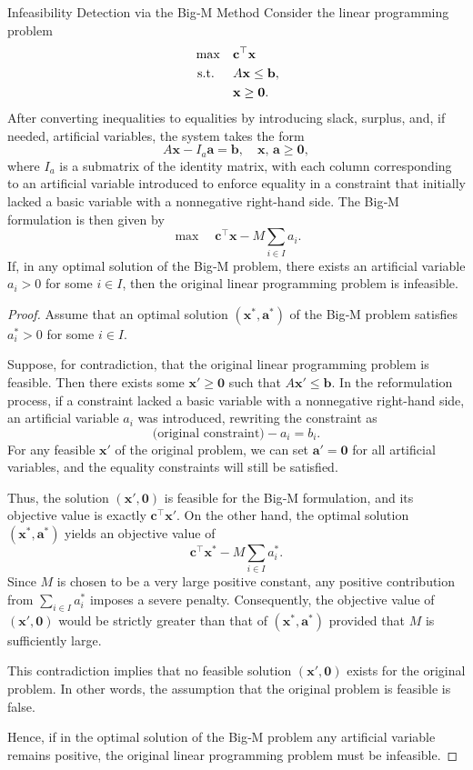 \begin{theorem}{Infeasibility Detection via the Big‑M Method}{}
Consider the linear programming problem
\[
\begin{aligned}
\max\quad & \mathbf{c}^\top \mathbf{x} \\
\text{ s.t. }\quad & A\mathbf{x} \le \mathbf{b}, \\
& \mathbf{x} \ge \mathbf{0}.
\end{aligned}
\]
After converting inequalities to equalities by introducing slack, surplus, and, if needed, artificial variables, the system takes the form
\[
A\mathbf{x} - I_a \mathbf{a} = \mathbf{b},\quad \mathbf{x},\, \mathbf{a} \ge \mathbf{0},
\]
where \( I_a \) is a submatrix of the identity matrix, with each column corresponding to an artificial variable introduced to enforce equality in a constraint that initially lacked a basic variable with a nonnegative right-hand side. The Big‑M formulation is then given by
\[
\max\quad \mathbf{c}^\top \mathbf{x} - M\sum_{i\in I} a_i.
\]
If, in any optimal solution of the Big‑M problem, there exists an artificial variable \(a_i > 0\) for some \(i\in I\), then the original linear programming problem is infeasible.
\end{theorem}

\begin{proof}
Assume that an optimal solution \((\mathbf{x}^*,\mathbf{a}^*)\) of the Big‑M problem satisfies \(a_i^* > 0\) for some \(i\in I\).

Suppose, for contradiction, that the original linear programming problem is feasible. Then there exists some \(\mathbf{x}'\ge \mathbf{0}\) such that \(A\mathbf{x}' \le \mathbf{b}\). In the reformulation process, if a constraint lacked a basic variable with a nonnegative right-hand side, an artificial variable \(a_i\) was introduced, rewriting the constraint as
\[
\text{(original constraint)} - a_i = b_i.
\]
For any feasible \(\mathbf{x}'\) of the original problem, we can set \(\mathbf{a}' = \mathbf{0}\) for all artificial variables, and the equality constraints will still be satisfied.

Thus, the solution \((\mathbf{x}',\mathbf{0})\) is feasible for the Big‑M formulation, and its objective value is exactly \(\mathbf{c}^\top \mathbf{x}'\). On the other hand, the optimal solution \((\mathbf{x}^*,\mathbf{a}^*)\) yields an objective value of 
\[
\mathbf{c}^\top \mathbf{x}^* - M\sum_{i\in I}a_i^*.
\]
Since \(M\) is chosen to be a very large positive constant, any positive contribution from \(\sum_{i\in I}a_i^*\) imposes a severe penalty. Consequently, the objective value of \((\mathbf{x}',\mathbf{0})\) would be strictly greater than that of \((\mathbf{x}^*,\mathbf{a}^*)\) provided that \(M\) is sufficiently large.

This contradiction implies that no feasible solution \((\mathbf{x}',\mathbf{0})\) exists for the original problem. In other words, the assumption that the original problem is feasible is false.

Hence, if in the optimal solution of the Big‑M problem any artificial variable remains positive, the original linear programming problem must be infeasible.
\end{proof}

